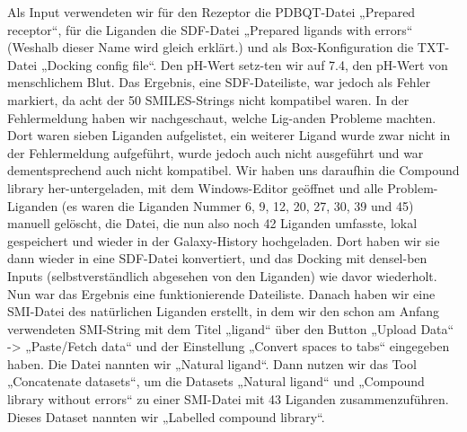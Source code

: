 \documentclass[11pt]{article}
\begin{document}
    Als Input verwendeten wir für den Rezeptor die PDBQT-Datei „Prepared receptor“, für die Liganden die SDF-Datei „Prepared ligands with errors“ (Weshalb dieser Name wird gleich erklärt.) und als Box-Konfiguration die TXT-Datei „Docking config file“. Den pH-Wert setz-ten wir auf 7.4, den pH-Wert von menschlichem Blut.
    Das Ergebnis, eine SDF-Dateiliste, war jedoch als Fehler markiert, da acht der 50 SMILES-Strings nicht kompatibel waren. In der Fehlermeldung haben wir nachgeschaut, welche Lig-anden Probleme machten. Dort waren sieben Liganden aufgelistet, ein weiterer Ligand wurde zwar nicht in der Fehlermeldung aufgeführt, wurde jedoch auch nicht ausgeführt und war dementsprechend auch nicht kompatibel. Wir haben uns daraufhin die Compound library her-untergeladen, mit dem Windows-Editor geöffnet und alle Problem-Liganden (es waren die Liganden Nummer 6, 9, 12, 20, 27, 30, 39 und 45) manuell gelöscht, die Datei, die nun also noch 42 Liganden umfasste, lokal gespeichert und wieder in der Galaxy-History hochgeladen. Dort haben wir sie dann wieder in eine SDF-Datei konvertiert, und das Docking mit densel-ben Inputs (selbstverständlich abgesehen von den Liganden) wie davor wiederholt.
    Nun war das Ergebnis eine funktionierende Dateiliste.
    Danach haben wir eine SMI-Datei des natürlichen Liganden erstellt, in dem wir den schon am Anfang verwendeten SMI-String mit dem Titel „ligand“ über den Button „Upload Data“ -> „Paste/Fetch data“ und der Einstellung „Convert spaces to tabs“ eingegeben haben. Die Datei nannten wir „Natural ligand“.
    Dann nutzen wir das Tool „Concatenate datasets“, um die Datasets „Natural ligand“ und „Compound library without errors“ zu einer SMI-Datei mit 43 Liganden zusammenzuführen. Dieses Dataset nannten wir „Labelled compound library“.
\end{document}
